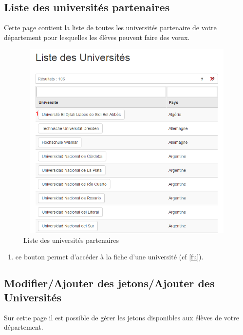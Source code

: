  \subsection{Liste des universités partenaires}
 \label{lua}
 Cette page contient la liste de toutes les universités partenaire de votre département pour lesquelles les élèves peuvent faire des vœux.
 \begin{figure}[H]
 	\centering
 	
 	\includegraphics[width=14cm,height=10cm]{Images/Admin/liste_univ_admin.png}
 	\caption{Liste des universités partenaires}
 	
 \end{figure}
 \begin{enumerate}
 \item ce bouton permet d'accéder à la fiche d'une université (cf \ref{fu}).
 \end{enumerate}
 
 \bigbreak\bigbreak\bigbreak
  \subsection{Modifier/Ajouter des jetons/Ajouter des Universités}
  \label{gua}
  Sur cette page il est possible de gérer les jetons disponibles aux élèves de votre département.
  
